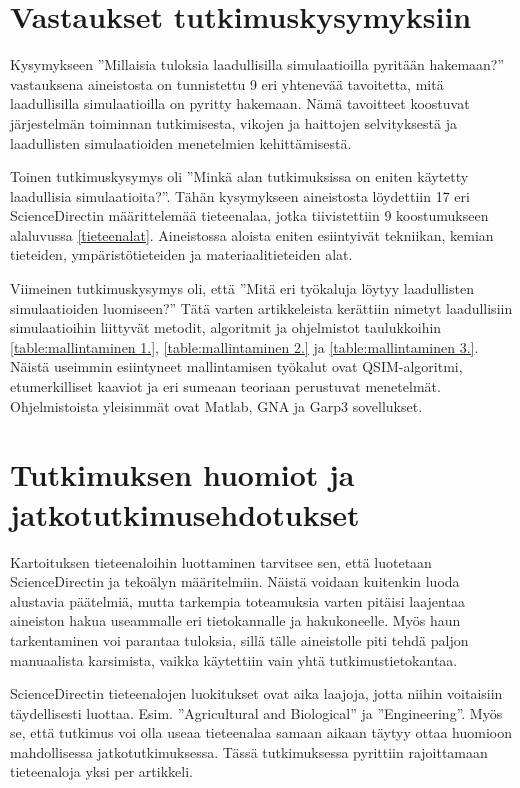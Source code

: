 \documentclass[utf8]{gradu3}
\begin{document}
\section{Vastaukset tutkimuskysymyksiin}
Kysymykseen 
''Millaisia tuloksia laadullisilla simulaatioilla pyritään hakemaan?''
vastauksena aineistosta on tunnistettu 9 eri yhtenevää tavoitetta, 
mitä laadullisilla simulaatioilla on pyritty hakemaan. Nämä tavoitteet
koostuvat järjestelmän toiminnan tutkimisesta, 
vikojen ja haittojen selvityksestä ja laadullisten simulaatioiden menetelmien kehittämisestä.

Toinen tutkimuskysymys oli
''Minkä alan tutkimuksissa on eniten käytetty laadullisia simulaatioita?''.
Tähän kysymykseen aineistosta löydettiin 17 eri ScienceDirectin määrittelemää
tieteenalaa, jotka tiivistettiin 9 koostumukseen alaluvussa \ref{tieteenalat}.
Aineistossa aloista eniten esiintyivät tekniikan, kemian tieteiden, ympäristötieteiden ja materiaalitieteiden alat.

Viimeinen tutkimuskysymys oli, että
''Mitä eri työkaluja löytyy laadullisten simulaatioiden luomiseen?''
Tätä varten artikkeleista kerättiin nimetyt laadullisiin simulaatioihin liittyvät
metodit, algoritmit ja ohjelmistot taulukkoihin \ref{table:mallintaminen 1.},
\ref{table:mallintaminen 2.} ja \ref{table:mallintaminen 3.}. 
Näistä useimmin esiintyneet mallintamisen työkalut
ovat QSIM-algoritmi, etumerkilliset kaaviot
ja eri sumeaan teoriaan perustuvat menetelmät.
Ohjelmistoista yleisimmät ovat Matlab, GNA ja Garp3 sovellukset.

\section{Tutkimuksen huomiot ja jatkotutkimusehdotukset}
Kartoituksen tieteenaloihin luottaminen tarvitsee sen, 
että luotetaan ScienceDirectin  ja tekoälyn määritelmiin. 
Näistä voidaan kuitenkin luoda alustavia päätelmiä, mutta tarkempia
toteamuksia varten pitäisi laajentaa aineiston hakua useammalle eri tietokannalle ja hakukoneelle. Myös haun tarkentaminen voi parantaa tuloksia, sillä tälle 
aineistolle piti tehdä paljon manuaalista karsimista, 
vaikka käytettiin vain yhtä tutkimustietokantaa.

ScienceDirectin tieteenalojen luokitukset ovat aika laajoja, jotta niihin voitaisiin täydellisesti luottaa. Esim. ''Agricultural and Biological'' ja ''Engineering''. Myös se, että tutkimus voi olla useaa tieteenalaa samaan aikaan täytyy ottaa huomioon mahdollisessa jatkotutkimuksessa. 
Tässä tutkimuksessa pyrittiin rajoittamaan tieteenaloja yksi per artikkeli.
\end{document}
